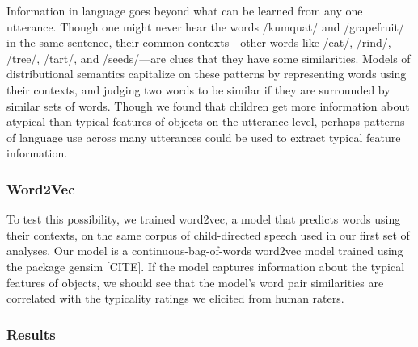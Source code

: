 \documentclass[10pt, letterpaper]{article}
\begin{document}
Information in language goes beyond what can be learned from any one
utterance. Though one might never hear the words /kumquat/ and
/grapefruit/ in the same sentence, their common contexts---other words
like /eat/, /rind/, /tree/, /tart/, and /seeds/---are clues that they
have some similarities. Models of distributional semantics capitalize on
these patterns by representing words using their contexts, and judging
two words to be similar if they are surrounded by similar sets of words.
Though we found that children get more information about atypical than
typical features of objects on the utterance level, perhaps patterns of
language use across many utterances could be used to extract typical
feature information.

\hypertarget{word2vec}{%
\subsubsection{Word2Vec}\label{word2vec}}

To test this possibility, we trained word2vec, a model that predicts
words using their contexts, on the same corpus of child-directed speech
used in our first set of analyses. Our model is a
continuous-bag-of-words word2vec model trained using the package gensim
{[}CITE{]}. If the model captures information about the typical features
of objects, we should see that the model's word pair similarities are
correlated with the typicality ratings we elicited from human raters.

\hypertarget{results-1}{%
\subsubsection{Results}\label{results-1}}
\end{document}
